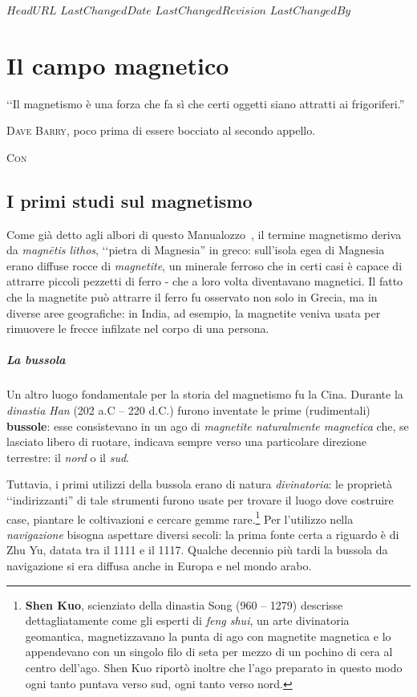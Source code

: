 \svnidlong
{$HeadURL$}
{$LastChangedDate$}
{$LastChangedRevision$}
{$LastChangedBy$}

\chapter{Il campo magnetico}

\begin{introduction}
	‘‘Il magnetismo è una forza che fa sì che certi oggetti siano attratti ai frigoriferi.''
	\begin{flushright}
		\textsc{Dave Barry}, poco prima di essere bocciato al secondo appello.
	\end{flushright}
\end{introduction}
\lettrine[findent=1pt, nindent=0pt]{C}{on}

\section{I primi studi sul magnetismo}
Come già detto agli albori di questo Manualozzo\texttrademark\ , il termine magnetismo deriva da \textit{magnētis lithos}, ‘‘pietra di Magnesia'' in greco: sull'isola egea di Magnesia erano diffuse rocce di \textit{magnetite}, un minerale ferroso che in certi casi è capace di attrarre piccoli pezzetti di ferro - che a loro volta diventavano magnetici.
Il fatto che la magnetite può attrarre il ferro fu osservato non solo in Grecia, ma in diverse aree geografiche: in India, ad esempio, la magnetite veniva usata per rimuovere le frecce infilzate nel corpo di una persona.
\paragraph{La bussola}
Un altro luogo fondamentale per la storia del magnetismo fu la Cina. Durante la \textit{dinastia Han} (202 a.C – 220 d.C.) furono inventate le prime (rudimentali) \textbf{bussole}: esse consistevano in un ago di \textit{magnetite naturalmente magnetica} che, se lasciato libero di ruotare, indicava sempre verso una particolare direzione terrestre: il \textit{nord} o il \textit{sud}.

Tuttavia, i primi utilizzi della bussola erano di natura \textit{divinatoria}: le proprietà ‘‘indirizzanti'' di tale strumenti furono usate per trovare il luogo dove costruire case, piantare le coltivazioni e cercare gemme rare.\footnote{\textbf{Shen Kuo}, scienziato della dinastia Song (960 – 1279) descrisse dettagliatamente come gli esperti di \textit{feng shui}, un arte divinatoria geomantica, magnetizzavano la punta di ago con magnetite magnetica e lo appendevano con un singolo filo di seta per mezzo di un pochino di cera al centro dell'ago. Shen Kuo riportò inoltre che l'ago preparato in questo modo ogni tanto puntava verso sud, ogni tanto verso nord.} Per l'utilizzo nella \textit{navigazione} bisogna aspettare diversi secoli: la prima fonte certa a riguardo è di Zhu Yu, datata tra il 1111 e il 1117. Qualche decennio più tardi la bussola da navigazione si era diffusa anche in Europa e nel mondo arabo.

